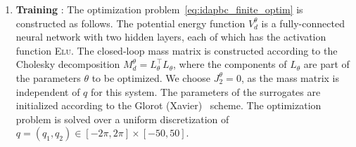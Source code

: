 \begin{enumerate}
    \item \textbf{Training} : The optimization
    problem~\eqref{eq:idapbc_finite_optim} is constructed as follows. The
    potential energy function $V_d^\theta$ is a fully-connected neural network
    with two hidden layers, each of which has the activation function
    \textsc{Elu}.
    The closed-loop mass matrix is constructed according to the Cholesky
    decomposition $M_d^\theta = L^\top_\theta L_\theta$, where the components of
    $L_\theta$ are part of the parameters $\theta$ to be optimized.
    We choose $J_2^\theta = 0$, as the mass matrix is independent of $q$ for
    this system.
    The parameters of the surrogates are initialized according to the Glorot
    (Xavier)~\cite{glorot2010understanding} scheme.
    The optimization problem is solved over a uniform discretization of $q = \left(
    q_1, q_2 \right) \in [-2\pi, 2\pi] \times [-50, 50]$.
    


\end{enumerate}
